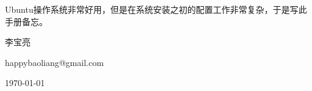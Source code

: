 \vspace*{0.0cm}
\thispagestyle{empty}
\vspace*{2.2cm}
\centerline{\hei{\color{darkblue}{第一版前言}}}\vspace{2cm}


Ubuntu操作系统非常好用，但是在系统安装之初的配置工作非常复杂，于是写此手册备忘。


\vspace{2cm}

\hfill 李宝亮\hspace{0.2em}

\hfill happybaoliang@gmail.com \hspace{0.2em}

\hfill \today\hspace{0.2em}
